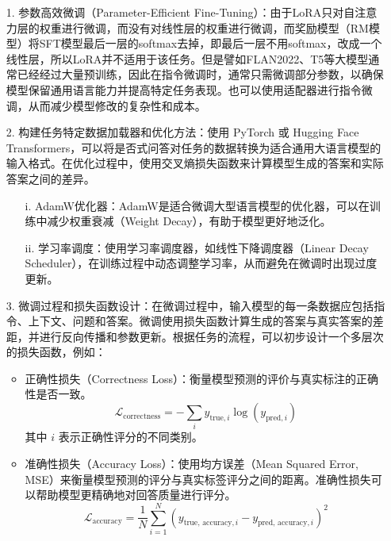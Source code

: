 \begin{itemize}
    \item [1.] 参数高效微调（Parameter-Efficient Fine-Tuning）：由于LoRA\cite{2021LoRA}只对自注意力层的权重进行微调，而没有对线性层的权重进行微调，而奖励模型（RM模型）将SFT模型最后一层的softmax去掉，即最后一层不用softmax，改成一个线性层，所以LoRA并不适用于该任务。但是譬如FLAN2022、T5等大模型通常已经经过大量预训练，因此在指令微调时，通常只需微调部分参数\cite{li2021prefix}，以确保模型保留通用语言能力并提高特定任务表现。也可以使用适配器进行指令微调\cite{hu-etal-2023-llm}，从而减少模型修改的复杂性和成本。
    \item [2.]构建任务特定数据加载器和优化方法：使用 PyTorch 或 Hugging Face Transformers，可以将是否式问答对任务的数据转换为适合通用大语言模型的输入格式。在优化过程中，使用交叉熵损失函数来计算模型生成的答案和实际答案之间的差异。
          \begin{itemize}
              \item [i.]AdamW优化器\cite{hu-etal-2023-llm}：AdamW是适合微调大型语言模型的优化器，可以在训练中减少权重衰减（Weight Decay），有助于模型更好地泛化。
              \item [ii.]学习率调度：使用学习率调度器，如线性下降调度器（Linear Decay Scheduler），在训练过程中动态调整学习率，从而避免在微调时出现过度更新。
          \end{itemize}
    \item [3.]微调过程和损失函数设计：在微调过程中，输入模型的每一条数据应包括指令、上下文、问题和答案。微调使用损失函数计算生成的答案与真实答案的差距，并进行反向传播和参数更新。根据任务的流程，可以初步设计一个多层次的损失函数，例如：
          \begin{itemize}
              \item 正确性损失（Correctness Loss）：衡量模型预测的评价与真实标注的正确性是否一致。
                    \begin{equation}
                        \mathcal{L}_{\text{correctness}} = -\sum_{i} y_{\text{true}, i} \log(y_{\text{pred}, i})
                    \end{equation}
                    其中 \( i \) 表示正确性评分的不同类别。
              \item 准确性损失（Accuracy Loss）：使用均方误差（Mean Squared Error, MSE）来衡量模型预测的评分与真实标签评分之间的距离。准确性损失可以帮助模型更精确地对回答质量进行评分。
                    \begin{equation}
                        \mathcal{L}_{\text{accuracy}} = \frac{1}{N} \sum_{i=1}^{N} (y_{\text{true, accuracy}, i} - y_{\text{pred, accuracy}, i})^2

\end{equation}
\end{itemize}
\end{itemize}
